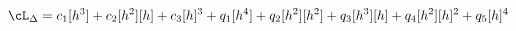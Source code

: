 \begin{equation}
\cL_{\Delta} 
= c_1 [h^3] + c_2 [h^2] [h] + c_3 [h]^3 + q_1 [h^4] + q_2 [h^2] [h^2]
+ q_3 [h^3] [h] + q_4 [h^2] [h]^2  + q_5 [h]^4 \label{hcq}
\end{equation}

